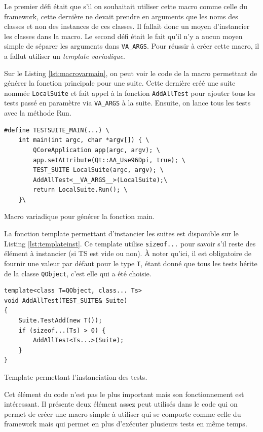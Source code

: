 \documentclass[a4paper]{article}
\begin{document}
Le premier défi était que s'il on souhaitait utiliser cette macro comme celle du
framework, cette dernière ne devait prendre en arguments que les noms des
classes et non des instances de ces classes. Il fallait donc un moyen
d'instancier les classes dans la macro. Le second défi était le fait qu'il n'y a
aucun moyen simple de séparer les arguments dans \verb|VA_ARGS|. Pour réussir à
créer cette macro, il a fallut utiliser un \textit{template variadique}.

Sur le Listing \ref{lst:macrovarmain}, on peut voir le code de la macro
permettant de générer la fonction principale pour une suite. Cette dernière créé
une suite nommée \verb|LocalSuite| et fait appel à la fonction \verb|AddAllTest|
pour ajouter tous les tests passé en paramètre via \verb|VA_ARGS| à la suite.
Ensuite, on lance tous les tests avec la méthode Run.

\begin{listing}[ht!]
\begin{verbatim}
#define TESTSUITE_MAIN(...) \
    int main(int argc, char *argv[]) { \
        QCoreApplication app(argc, argv); \
        app.setAttribute(Qt::AA_Use96Dpi, true); \
        TEST_SUITE LocalSuite(argc, argv); \
        AddAllTest<__VA_ARGS__>(LocalSuite);\
        return LocalSuite.Run(); \
    }\
\end{verbatim}
\caption{Macro variadique pour générer la fonction main.}
\label{lst:macrovarmain}
\end{listing}

La fonction template permettant d'instancier les suites est disponible sur le
Listing \ref{lst:templateinst}. Ce template utilise \verb|sizeof...| pour savoir
s'il reste des élément à instancier (si TS est vide ou non). À noter qu'ici, il
est obligatoire de fournir une valeur par défaut pour le type \verb|T|, étant
donné que tous les tests hérite de la classe \verb|QObject|, c'est elle qui a
été choisie.

\begin{listing}[ht!]
\begin{verbatim}
template<class T=QObject, class... Ts>
void AddAllTest(TEST_SUITE& Suite)
{
    Suite.TestAdd(new T());
    if (sizeof...(Ts) > 0) {
        AddAllTest<Ts...>(Suite);
    }
}
\end{verbatim}
\caption{Template permettant l'instanciation des tests.}
\label{lst:templateinst}
\end{listing}

Cet élément du code n'est pas le plus important mais son fonctionnement est
intéressant. Il présente deux élément assez peut utilisés dans le code qui on
permet de créer une macro simple à utiliser qui se comporte comme celle du
framework mais qui permet en plus d'exécuter plusieurs tests en même temps. \\
\end{document}
